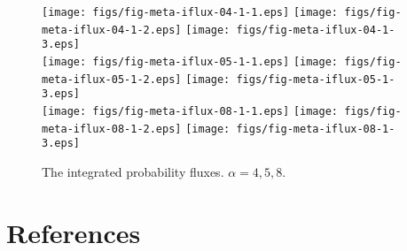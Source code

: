 \documentclass[aip,jcp,a4paper,reprint,onecolumn]{revtex4-1}
\begin{document}
\begin{figure}
  \centering
  \texttt{[image: figs/fig-meta-iflux-04-1-1.eps]}
  \texttt{[image: figs/fig-meta-iflux-04-1-2.eps]}
  \texttt{[image: figs/fig-meta-iflux-04-1-3.eps]}\\
  \texttt{[image: figs/fig-meta-iflux-05-1-1.eps]}
  \texttt{[image: figs/fig-meta-iflux-05-1-2.eps]}
  \texttt{[image: figs/fig-meta-iflux-05-1-3.eps]}\\
  \texttt{[image: figs/fig-meta-iflux-08-1-1.eps]}
  \texttt{[image: figs/fig-meta-iflux-08-1-2.eps]}
  \texttt{[image: figs/fig-meta-iflux-08-1-3.eps]}
  \caption{The integrated probability fluxes. $\alpha = 4,5,8$.}
  \label{fig:tmp3}
\end{figure}



\section*{References}
{}

\end{document}
